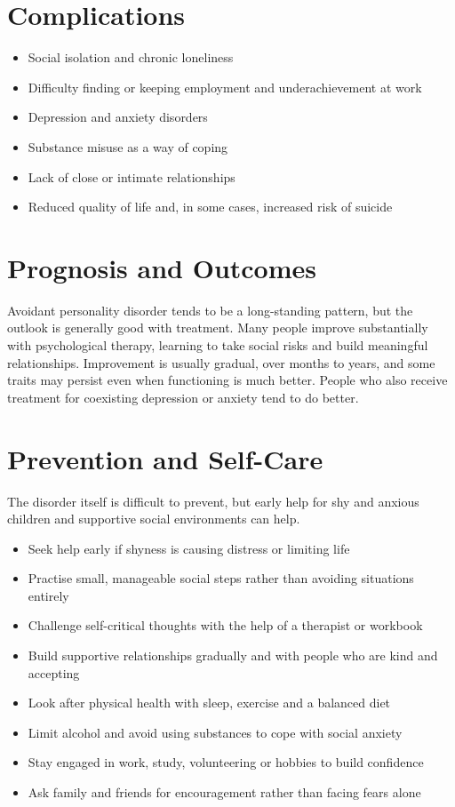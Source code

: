 \section*{Complications}
\begin{itemize}
    \item Social isolation and chronic loneliness
    \item Difficulty finding or keeping employment and underachievement at work
    \item Depression and anxiety disorders
    \item Substance misuse as a way of coping
    \item Lack of close or intimate relationships
    \item Reduced quality of life and, in some cases, increased risk of suicide
\end{itemize}

\section*{Prognosis and Outcomes}
Avoidant personality disorder tends to be a long-standing pattern, but the outlook is generally good with treatment. Many people improve substantially with psychological therapy, learning to take social risks and build meaningful relationships. Improvement is usually gradual, over months to years, and some traits may persist even when functioning is much better. People who also receive treatment for coexisting depression or anxiety tend to do better.

\section*{Prevention and Self-Care}
The disorder itself is difficult to prevent, but early help for shy and anxious children and supportive social environments can help.

\begin{itemize}
    \item Seek help early if shyness is causing distress or limiting life
    \item Practise small, manageable social steps rather than avoiding situations entirely
    \item Challenge self-critical thoughts with the help of a therapist or workbook
    \item Build supportive relationships gradually and with people who are kind and accepting
    \item Look after physical health with sleep, exercise and a balanced diet
    \item Limit alcohol and avoid using substances to cope with social anxiety
    \item Stay engaged in work, study, volunteering or hobbies to build confidence
    \item Ask family and friends for encouragement rather than facing fears alone
\end{itemize}

